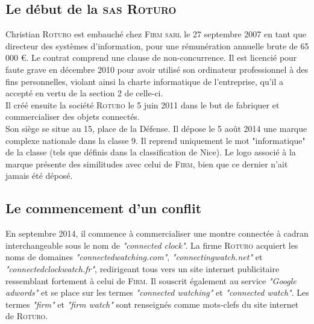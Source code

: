\subsection{Le début de la \textsc{sas Roturo}}
Christian \textsc{Roturo} est embauché chez \textsc{Firm sarl} le 27 septembre 2007 en tant que directeur des systèmes d'information, pour une rémunération annuelle brute de 65 000 \euro. Le contrat comprend une clause de non-concurrence. Il est licencié pour faute grave en décembre 2010 pour avoir utilisé son ordinateur professionnel à des fins personnelles, violant ainsi la charte informatique de l'entreprise, qu'il a accepté en vertu de la section 2 de celle-ci.\\
Il créé ensuite la société \textsc{Roturo} le 5 juin 2011 dans le but de fabriquer et commercialiser des objets connectés. \\
Son siège se situe au 15, place de la Défense. Il dépose le 5 août 2014 une marque complexe nationale dans la classe 9. Il reprend uniquement le mot "informatique" de la classe (tels que définis dans la classification de Nice). Le logo associé à la marque présente des similitudes avec celui de \textsc{Firm}, bien que ce dernier n'ait jamais été déposé. \\
\subsection{Le commencement d'un conflit}
En septembre 2014, il commence à commercialiser une montre connectée à cadran interchangeable sous le nom de \textit{"connected clock"}. La firme \textsc{Roturo} acquiert les noms de domaines \textit{"connectedwatching.com"}, \textit{"connectingwatch.net"} et \textit{"connectedclockwatch.fr"}, redirigeant tous vers un site internet publicitaire ressemblant fortement à celui de \textsc{Firm}. Il souscrit également au service \textit{"Google adwords"} et se place sur les termes \textit{"connected watching"} et \textit{"connected watch"}. Les termes \textit{"firm"} et \textit{"firm watch"} sont renseignés comme mots-clefs du site internet de \textsc{Roturo}.\\
